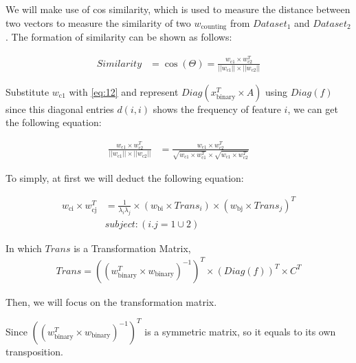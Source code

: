 We will make use of cos similarity, which is used to measure the distance between two vectors to measure the similarity of two \(w_{\text{counting}}\) from \(Dataset_{\text{1}}\) and \(Dataset_{\text{2}}\). The formation of similarity can be shown as follows:

\begin{equation} \label{29} 
\begin{split}
Similarity & = \cos(\Theta) = \frac{w_{\text{c1}} \times w_{\text{c2}}^T} {||w_{\text{c1}}|| \times ||w_{\text{c2}}|| }
\end{split}
\end{equation}

Substitute \(w_{\text{c1}}\) with \ref{eq:12} and represent \(Diag(x_{\text{binary}}^T \times A)\) using \(Diag(f)\) since this diagonal entries \(d(i,i) \) shows the frequency of feature \(i\), we can get the following equation:


\begin{equation} \label{30} 
\begin{split}
\frac{w_{\text{c1}} \times w_{\text{c2}}^T} {||w_{\text{c1}}|| \times ||w_{\text{c2}}|| } & =  \frac{w_{\text{c1}} \times w_{\text{c2}}^T} {\sqrt{w_{\text{c1}} \times w_{\text{c1}}^T} \times \sqrt{w_{\text{c1}} \times w_{\text{c2}}^T} }
\end{split}
\end{equation}

To simply, at first we will deduct the following equation:

\begin{equation} \label{31} 
\begin{split}
w_{\text{ci}} \times w_{\text{cj}}^T & = \frac{1}{{\lambda}_{i}{\lambda}_{j} } \times (w_{\text{bi}} \times Trans_{i}) \times (w_{\text{bj}} \times Trans_{j})^T \\
& subject : (i.j = 1 \cup 2)
\end{split}
\end{equation}


In which \(Trans\) is a Transformation Matrix, 
\begin{equation} \label{31} 
\begin{split}
Trans = ((w_{\text{binary}}^T \times w_{\text{binary}})^{-1})^T \times (Diag(f))^T \times C^T  
\end{split}
\end{equation}

Then, we will focus on the transformation matrix. 

Since \(((w_{\text{binary}}^T \times w_{\text{binary}})^{-1})^T\) is a symmetric matrix, so it equals to its own transposition. 


